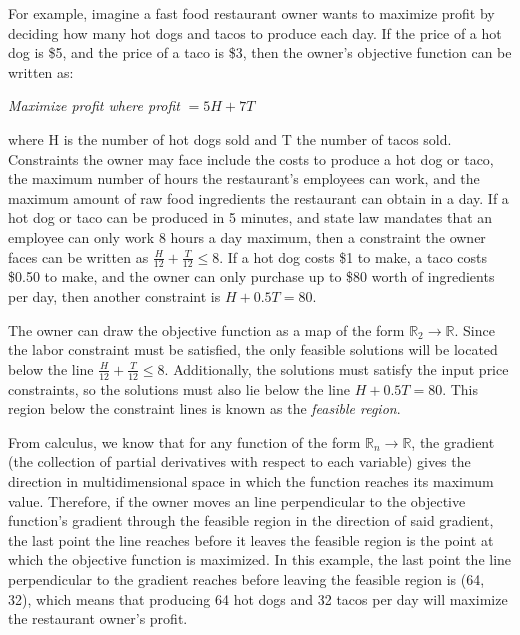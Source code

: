 \documentclass[5p,times,11pt]{elsarticle}
\begin{document}
For example, imagine a fast food restaurant owner wants to maximize profit by deciding how many hot dogs and tacos to produce each day. If the price of a hot dog is \$5, and the price of a taco is \$3, then the owner's objective function can be written as:
\begin{center}
\textit{Maximize profit where profit} $= 5H + 7T$
\end{center}
where H is the number of hot dogs sold and T the number of tacos sold. Constraints the owner may face include the costs to produce a hot dog or taco, the maximum number of hours the restaurant's employees can work, and the maximum amount of raw food ingredients the restaurant can obtain in a day. If a hot dog or taco can be produced in 5 minutes, and state law mandates that an employee can only work 8 hours a day maximum, then a constraint the owner faces can be written as $\frac{H}{12} + \frac{T}{12} \leq 8$. If a hot dog costs \$1 to make, a taco costs \$0.50 to make, and the owner can only purchase up to \$80 worth of ingredients per day, then another constraint is $H + 0.5T = 80$.

The owner can draw the objective function as a map of the form $\mathbb{R}_2 \rightarrow  \mathbb{R}$. Since the labor constraint must be satisfied, the only feasible solutions will be located below the line $\frac{H}{12} + \frac{T}{12} \leq 8$. Additionally, the solutions must satisfy the input price constraints, so the solutions must also lie below the line $H + 0.5T = 80$. This region below the constraint lines is known as the \textit{feasible region}.

From calculus, we know that for any function of the form $\mathbb{R}_n \rightarrow  \mathbb{R}$, the gradient (the collection of partial derivatives with respect to each variable) gives the direction in multidimensional space in which the function reaches its maximum value. Therefore, if the owner moves an line perpendicular to the objective function's gradient through the feasible region in the direction of said gradient, the last point the line reaches before it leaves the feasible region is the point at which the objective function is maximized. In this example, the last point the line perpendicular to the gradient reaches before leaving the feasible region is (64, 32), which means that producing 64 hot dogs and 32 tacos per day will maximize the restaurant owner's profit.
\end{document}

